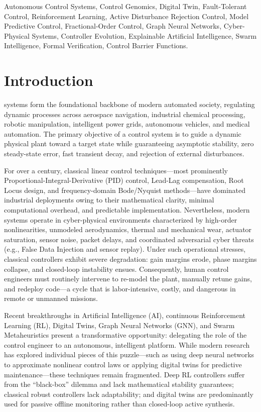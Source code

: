 \documentclass[journal,twocolumn]{IEEEtran}
\begin{document}
\begin{IEEEkeywords}
Autonomous Control Systems, Control Genomics, Digital Twin, Fault-Tolerant Control, Reinforcement Learning, Active Disturbance Rejection Control, Model Predictive Control, Fractional-Order Control, Graph Neural Networks, Cyber-Physical Systems, Controller Evolution, Explainable Artificial Intelligence, Swarm Intelligence, Formal Verification, Control Barrier Functions.
\end{IEEEkeywords}

\section{Introduction}
 systems form the foundational backbone of modern automated society, regulating dynamic processes across aerospace navigation, industrial chemical processing, robotic manipulation, intelligent power grids, autonomous vehicles, and medical automation. The primary objective of a control system is to guide a dynamic physical plant toward a target state while guaranteeing asymptotic stability, zero steady-state error, fast transient decay, and rejection of external disturbances.

For over a century, classical linear control techniques—most prominently Proportional-Integral-Derivative (PID) control, Lead-Lag compensation, Root Locus design, and frequency-domain Bode/Nyquist methods—have dominated industrial deployments owing to their mathematical clarity, minimal computational overhead, and predictable implementation. Nevertheless, modern systems operate in cyber-physical environments characterized by high-order nonlinearities, unmodeled aerodynamics, thermal and mechanical wear, actuator saturation, sensor noise, packet delays, and coordinated adversarial cyber threats (e.g., False Data Injection and sensor replay). Under such operational stresses, classical controllers exhibit severe degradation: gain margins erode, phase margins collapse, and closed-loop instability ensues. Consequently, human control engineers must routinely intervene to re-model the plant, manually retune gains, and redeploy code—a cycle that is labor-intensive, costly, and dangerous in remote or unmanned missions.

Recent breakthroughs in Artificial Intelligence (AI), continuous Reinforcement Learning (RL), Digital Twins, Graph Neural Networks (GNN), and Swarm Metaheuristics present a transformative opportunity: delegating the role of the control engineer to an autonomous, intelligent platform. While modern research has explored individual pieces of this puzzle—such as using deep neural networks to approximate nonlinear control laws or applying digital twins for predictive maintenance—these techniques remain fragmented. Deep RL controllers suffer from the ``black-box'' dilemma and lack mathematical stability guarantees; classical robust controllers lack adaptability; and digital twins are predominantly used for passive offline monitoring rather than closed-loop active synthesis.
\end{document}
